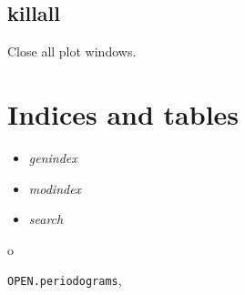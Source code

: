 \documentclass[letterpaper,10pt,english]{sphinxmanual}
\begin{document}
\section{killall}
\label{commands:killall}
Close all plot windows.


\chapter{Indices and tables}
\label{index:indices-and-tables}\begin{itemize}
\item {} 
\emph{genindex}

\item {} 
\emph{modindex}

\item {} 
\emph{search}

\end{itemize}


\renewcommand{\indexname}{Python Module Index}
\begin{theindex}
\def\bigletter#1{{\Large\sffamily#1}\nopagebreak\vspace{1mm}}
\bigletter{o}
\item {\texttt{OPEN.periodograms}}, \pageref{api:module-OPEN.periodograms}
\end{theindex}

\renewcommand{\indexname}{Index}
\printindex
\end{document}
